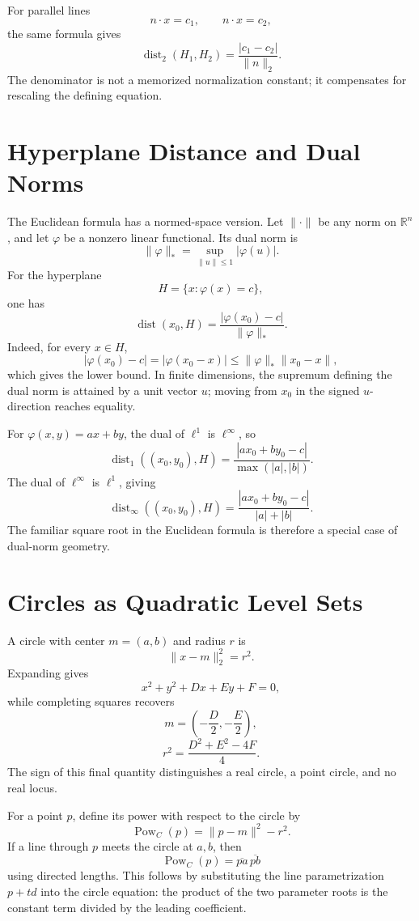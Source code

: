 For parallel lines
\[
  n\cdot x=c_1,
  \qquad
  n\cdot x=c_2,
\]
the same formula gives
\[
  \operatorname{dist}_2(H_1,H_2)
  =\frac{|c_1-c_2|}{\|n\|_2}.
\]
The denominator is not a memorized normalization constant; it compensates for rescaling the defining equation.

\section{Hyperplane Distance and Dual Norms}

The Euclidean formula has a normed-space version.  Let \(\|\cdot\|\) be any norm on \(\mathbb R^n\), and let \(\varphi\) be a nonzero linear functional.  Its dual norm is
\[
  \|\varphi\|_*
  =\sup_{\|u\|\le1}|\varphi(u)|.
\]
For the hyperplane
\[
  H=\{x:\varphi(x)=c\},
\]
one has
\[
  \boxed{
  \operatorname{dist}(x_0,H)
  =\frac{|\varphi(x_0)-c|}{\|\varphi\|_*}.}
\]
Indeed, for every \(x\in H\),
\[
  |\varphi(x_0)-c|
  =|\varphi(x_0-x)|
  \le\|\varphi\|_*\|x_0-x\|,
\]
which gives the lower bound.  In finite dimensions, the supremum defining the dual norm is attained by a unit vector \(u\); moving from \(x_0\) in the signed \(u\)-direction reaches equality.

For \(\varphi(x,y)=ax+by\), the dual of \(\ell^1\) is \(\ell^\infty\), so
\[
  \operatorname{dist}_1((x_0,y_0),H)
  =\frac{|ax_0+by_0-c|}{\max(|a|,|b|)}.
\]
The dual of \(\ell^\infty\) is \(\ell^1\), giving
\[
  \operatorname{dist}_\infty((x_0,y_0),H)
  =\frac{|ax_0+by_0-c|}{|a|+|b|}.
\]
The familiar square root in the Euclidean formula is therefore a special case of dual-norm geometry.

\section{Circles as Quadratic Level Sets}

A circle with center \(m=(a,b)\) and radius \(r\) is
\[
  \|x-m\|_2^2=r^2.
\]
Expanding gives
\[
  x^2+y^2+Dx+Ey+F=0,
\]
while completing squares recovers
\[
  m=\left(-\frac D2,-\frac E2\right),
\]
\[
  r^2=\frac{D^2+E^2-4F}{4}.
\]
The sign of this final quantity distinguishes a real circle, a point circle, and no real locus.

For a point \(p\), define its power with respect to the circle by
\[
  \operatorname{Pow}_C(p)=\|p-m\|^2-r^2.
\]
If a line through \(p\) meets the circle at \(a,b\), then
\[
  \operatorname{Pow}_C(p)=\overline{pa}\,\overline{pb}
\]
using directed lengths.  This follows by substituting the line parametrization \(p+td\) into the circle equation: the product of the two parameter roots is the constant term divided by the leading coefficient.

